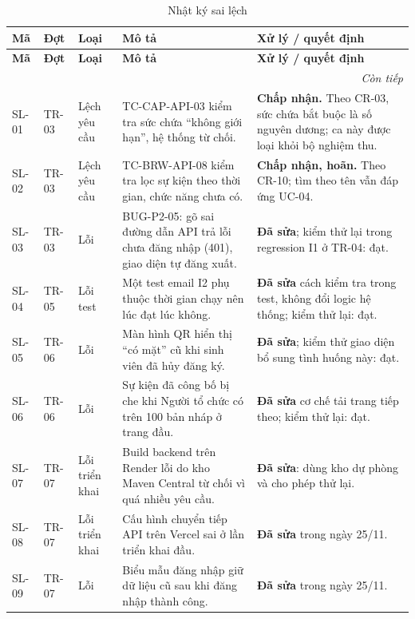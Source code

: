 \begingroup\footnotesize
\renewcommand{\arraystretch}{1.18}
\begin{longtable}{@{}p{.07\linewidth}p{.08\linewidth}p{.10\linewidth}p{.30\linewidth}p{.36\linewidth}@{}}
\caption{Nhật ký sai lệch}\label{tab:tr-deviations}\\
\toprule
\textbf{Mã} & \textbf{Đợt} & \textbf{Loại} & \textbf{Mô tả} & \textbf{Xử lý / quyết định}\\\midrule\endfirsthead
\toprule
\textbf{Mã} & \textbf{Đợt} & \textbf{Loại} & \textbf{Mô tả} & \textbf{Xử lý / quyết định}\\\midrule\endhead
\midrule\multicolumn{5}{r}{\textit{Còn tiếp}}\\\endfoot
\bottomrule\endlastfoot
SL-01 & TR-03 & Lệch yêu cầu & TC-CAP-API-03 kiểm tra sức chứa ``không giới hạn'', hệ thống từ chối. & \textbf{Chấp nhận.} Theo CR-03, sức chứa bắt buộc là số nguyên dương; ca này được loại khỏi bộ nghiệm thu.\\
SL-02 & TR-03 & Lệch yêu cầu & TC-BRW-API-08 kiểm tra lọc sự kiện theo thời gian, chức năng chưa có. & \textbf{Chấp nhận, hoãn.} Theo CR-10; tìm theo tên vẫn đáp ứng UC-04.\\
SL-03 & TR-03 & Lỗi & BUG-P2-05: gõ sai đường dẫn API trả lỗi chưa đăng nhập (401), giao diện tự đăng xuất. & \textbf{Đã sửa}; kiểm thử lại trong regression I1 ở TR-04: đạt.\\
SL-04 & TR-05 & Lỗi test & Một test email I2 phụ thuộc thời gian chạy nên lúc đạt lúc không. & \textbf{Đã sửa} cách kiểm tra trong test, không đổi logic hệ thống; kiểm thử lại: đạt.\\
SL-05 & TR-06 & Lỗi & Màn hình QR hiển thị ``có mặt'' cũ khi sinh viên đã hủy đăng ký. & \textbf{Đã sửa}; kiểm thử giao diện bổ sung tình huống này: đạt.\\
SL-06 & TR-06 & Lỗi & Sự kiện đã công bố bị che khi Người tổ chức có trên 100 bản nháp ở trang đầu. & \textbf{Đã sửa} cơ chế tải trang tiếp theo; kiểm thử lại: đạt.\\
SL-07 & TR-07 & Lỗi triển khai & Build backend trên Render lỗi do kho Maven Central từ chối vì quá nhiều yêu cầu. & \textbf{Đã sửa}: dùng kho dự phòng và cho phép thử lại.\\
SL-08 & TR-07 & Lỗi triển khai & Cấu hình chuyển tiếp API trên Vercel sai ở lần triển khai đầu. & \textbf{Đã sửa} trong ngày 25/11.\\
SL-09 & TR-07 & Lỗi & Biểu mẫu đăng nhập giữ dữ liệu cũ sau khi đăng nhập thành công. & \textbf{Đã sửa} trong ngày 25/11.\\

\end{longtable}
